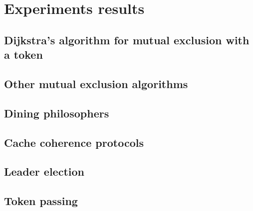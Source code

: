 \chapter{Experiments results}\label{chapter:experiments_abbreviations}

\section{Dijkstra’s algorithm for mutual exclusion with a token}

\section{Other mutual exclusion algorithms}

\begin{table}[h!]
    \centering
    \caption{}
    \label{table1}
\end{table}
\begin{table}[h!]
    \centering
    \caption{}
    \label{table1}
\end{table}
\begin{table}[h!]
    \centering
    \caption{}
    \label{table1}
\end{table}
\begin{table}[h!]
    \centering
    \caption{}
    \label{table1}
\end{table}


\section{Dining philosophers}
\section{Cache coherence protocols}
\section{Leader election}
\section{Token passing}
